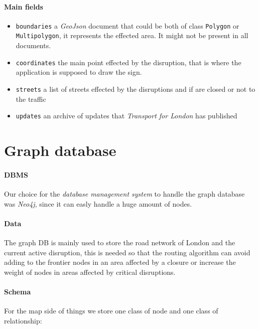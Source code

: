 \paragraph{Main fields}
\begin{itemize}
	\item \texttt{boundaries} a \textit{GeoJson} document that could be both of 
	class \texttt{Polygon} or \texttt{Multipolygon}, it represents the effected 
	area. It might not be present in all documents.
	
	\item \texttt{coordinates} the main point effected by the disruption, that 
	is where the application is supposed to draw the sign.
	
	\item \texttt{streets} a list of streets effected by the disruptions and if 
	are closed or not to the traffic
	
	\item \texttt{updates} an archive of updates that \textit{Transport for 
	London} has published
\end{itemize}

\section{Graph database}

\paragraph{DBMS} Our choice for the \textit{database management system} to 
handle the graph database was \textit{Neo4j}, since it can easly handle a huge amount of nodes.


\paragraph{Data} The graph DB is mainly used to store the road network of London and the current active disruption, this is needed so that the routing algorithm can avoid adding to the frontier nodes in an area affected by a closure or increase the weight of nodes in areas affected by critical disruptions.

\paragraph{Schema}For the map side of things we store one class of node and one class of relationship:

